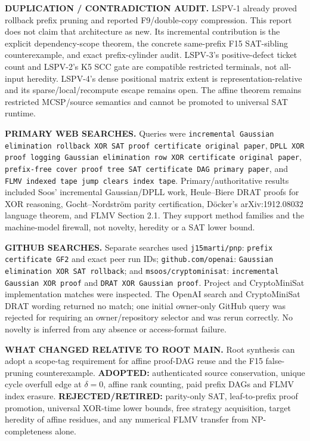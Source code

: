 \documentclass[11pt]{article}
\begin{document}
\textbf{DUPLICATION / CONTRADICTION AUDIT.} LSPV-1 already proved rollback
prefix pruning and reported F9/double-copy compression. This report does not
claim that architecture as new. Its incremental contribution is the explicit
dependency-scope theorem, the concrete same-prefix F15 SAT-sibling
counterexample, and exact prefix-cylinder audit. LSPV-3's positive-defect
ticket count and LSPV-2's K5 SCC gate are compatible restricted terminals, not
all-input heredity. LSPV-4's dense positional matrix extent is
representation-relative and its sparse/local/recompute escape remains open.
The affine theorem remains restricted MCSP/source semantics and cannot be
promoted to universal SAT runtime.

\textbf{PRIMARY WEB SEARCHES.} Queries were
\texttt{incremental Gaussian elimination rollback XOR SAT proof certificate
original paper}, \texttt{DPLL XOR proof logging Gaussian elimination row XOR
certificate original paper}, \texttt{prefix-free cover proof tree SAT
certificate DAG primary paper}, and \texttt{FLMV indexed tape jump clears index
tape}. Primary/authoritative results included Soos' incremental Gaussian/DPLL
work, Heule--Biere DRAT proofs for XOR reasoning, Gocht--Nordstr\"om parity
certification, D\"ocker's arXiv:1912.08032 language theorem, and FLMV
Section 2.1. They support method families and the machine-model firewall, not
novelty, heredity or a SAT lower bound.

\textbf{GITHUB SEARCHES.} Separate searches used
\texttt{j15marti/pnp}: \texttt{prefix certificate GF2} and exact peer run IDs;
\texttt{github.com/openai}: \texttt{Gaussian elimination XOR SAT rollback};
and \texttt{msoos/cryptominisat}: \texttt{incremental Gaussian XOR proof} and
\texttt{DRAT XOR Gaussian proof}. Project and CryptoMiniSat implementation
matches were inspected. The OpenAI search and CryptoMiniSat DRAT wording
returned no match; one initial owner-only GitHub query was rejected for
requiring an owner/repository selector and was rerun correctly. No novelty is
inferred from any absence or access-format failure.

\textbf{WHAT CHANGED RELATIVE TO ROOT MAIN.} Root synthesis can adopt a
scope-tag requirement for affine proof-DAG reuse and the F15 false-pruning
counterexample. \textbf{ADOPTED:} authenticated source conservation, unique
cycle overfull edge at $\delta=0$, affine rank counting, paid prefix DAGs and
FLMV index erasure. \textbf{REJECTED/RETIRED:} parity-only SAT, leaf-to-prefix
proof promotion, universal XOR-time lower bounds, free strategy acquisition,
target heredity of affine residues, and any numerical FLMV transfer from
NP-completeness alone.
\end{document}

